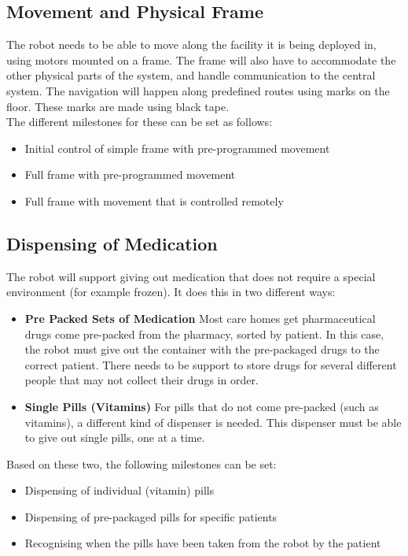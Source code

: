 \documentclass[a4paper,10pt,DIV10,openright,openbib]{scrreprt}
\begin{document}
\subsection{Movement and Physical Frame}
The robot needs to be able to move along the facility it is being deployed in, using
motors mounted on a frame. The frame will also have to accommodate the other
physical parts of the system, and handle communication to the central system. 
The navigation will happen along predefined routes using marks on the floor. 
These marks are made using black tape.\\
The different milestones for these can be set as follows:
\begin{itemize}
  \item Initial control of simple frame with pre-programmed movement
  \item Full frame with pre-programmed movement
  \item Full frame with movement that is controlled remotely
\end{itemize}

\subsection{Dispensing of Medication}
The robot will support giving out medication that does not require a special environment
(for example frozen). It does this in two different ways:
\begin{itemize}
  \item \textbf{Pre Packed Sets of Medication} Most care homes get pharmaceutical drugs come
pre-packed from the pharmacy, sorted by patient. In this case, the robot must
give out the container with the pre-packaged drugs to the correct patient. There
needs to be support to store drugs for several different people that may not
collect their drugs in order.
  \item \textbf{Single Pills (Vitamins)} For pills that do not come pre-packed
(such as vitamins), a different kind of dispenser is needed. This dispenser must
be able to give out single pills, one at a time.
\end{itemize}
Based on these two, the following milestones can be set:
\begin{itemize}
  \item Dispensing of individual (vitamin) pills
  \item Dispensing of pre-packaged pills for specific patients
  \item Recognising when the pills have been taken from the robot by the patient
\end{itemize}
\end{document}
